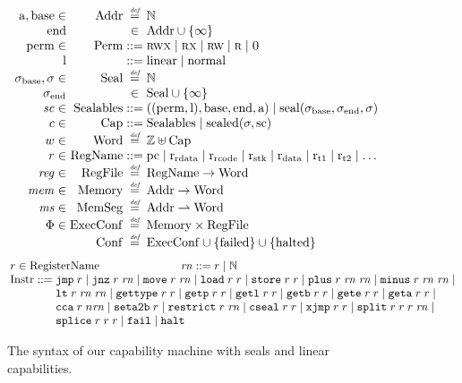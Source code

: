 \documentclass{jfp}
\renewcommand{\MemSeg}{\shareddom{MemSeg}}
\renewcommand{\Reg}{\shareddom{RegFile}}
\renewcommand{\RegName}{\shareddom{RegName}}
\renewcommand{\SealableCaps}{\shareddom{Sealables}}
\renewcommand{\rretc}{\mathrm{r}_{\mathrm{rcode}}}
\renewcommand{\rretd}{\mathrm{r}_{\mathrm{rdata}}}
\begin{document}
\begin{figure}[tb]
  \centering
  \[
  \arraycolsep=1.4pt
  \begin{array}{rrcl}
    \addrbnf,\basebnf \in & \Addr & \defeq & \nats \\
    \aendbnf & & \in & \Addr \cup \{\infty \}\\
    \permbnf \in& \Perm & \defbnf & \rwx \mid \rx \mid \rw \mid \ro \mid \noperm \\
    \linbnf && \defbnf & \linear \mid \normal\\
    \sealbasebnf, \sigma \in & \Seal & \defeq & \nats\\
    \sealendbnf & & \in & \Seal \cup \{\infty \}\\
    \vsc \in &\SealableCaps&\defbnf & ((\permbnf,\linbnf),\basebnf,\aendbnf,\addrbnf) \mid \seal{\sealbasebnf,\sealendbnf,\sigma}\\
    c \in&\Caps& \defbnf &  \SealableCaps \mid \sealed{\sigma,\scbnf}\\
    w \in &\Word & \defeq & \ints \uplus \Caps\\ 
    r \in& \RegName & \defbnf & \pcreg \mid \rretd \mid \rretc \mid \rstk \mid \rdata \mid \rtmp{1} \mid \rtmp{2} \mid \dots \\
    \reg \in &\Reg & \defeq & \RegName \fun \Word \\
    \mem \in&\Mem & \defeq & \Addr \fun \Word\\
    \ms \in  &\MemSeg & \defeq & \Addr \parfun \Word\\
    \Phi \in & \ExecConf & \defeq & \Mem \times \Reg\\
    &\Conf & \defeq & \ExecConf \cup \{\failed\} \cup \{\halted\} 
  \end{array}
\]
\[
  \arraycolsep=1.4pt
\begin{array}{rcl}
\multicolumn{3}{l}{    \arraycolsep=0pt
      \com{r} \in  \tRegName \hspace{2.5cm}   \com{\rn} \defbnf \com{r} \mid \nats
}\\
  \Instr &\defbnf & \tjmp{\com{r}} \mid \tjnz{\com{r}}{\com{\rn}} \mid \tmove{\com{r}}{\com{\rn}} \mid \tload{\com{r}}{\com{r}} \mid \tstore{\com{r}}{\com{r}} \mid \tplus{\com{r}}{\com{\rn}}{\com{\rn}} \mid \tminus{\com{r}}{\com{\rn}}{\com{\rn}} \mid\\
         & & \tlt{\com{r}}{\com{\rn}}{\com{\rn}} \mid \tisptr{\com{r}}{\com{r}} \mid\tgetp{\com{r}}{\com{r}} \mid \tgetlin{\com{r}}{\com{r}} \mid \tgetb{\com{r}}{\com{r}} \mid \tgete{\com{r}}{\com{r}} \mid \tgeta{\com{r}}{\com{r}}  \mid \\
  & & \tcca{\com{r}}{\com{n\rn}} \mid \tsetatob{\com{r}} \mid \trestrict{\com{r}}{\com{\rn}} \mid \tcseal{\com{r}}{\com{r}} \mid \txjmp{\com{r}}{\com{r}} \mid  \tsplit{\com{r}}{\com{r}}{\com{r}}{\com{\rn}} \mid\\ 
      & & \tsplice{\com{r}}{\com{r}}{\com{r}} \mid \tfail \mid \thalt 
\end{array}
\]
  \caption{The syntax of our capability machine with seals and linear capabilities.}
  \label{fig:target-syntax}
\end{figure}
\end{document}
